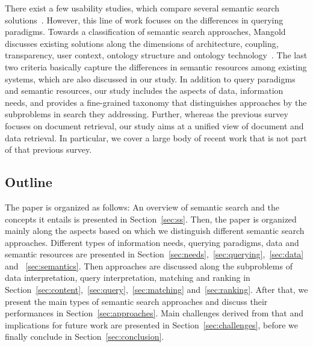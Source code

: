 There exist a few usability studies, which compare several semantic search solutions~\cite{DBLP:conf/semweb/KaufmannB07,DBLP:conf/esws/TranMH10}. However, this line of work focuses on the differences in querying paradigms. Towards a classification of semantic search approaches, Mangold discusses existing solutions along the dimensions of architecture, coupling, transparency, user context, ontology structure and ontology technology~\cite{DBLP:journals/ijmso/Mangold07}. The last two criteria basically capture the differences in semantic resources among existing systems, which are also discussed in our study. In addition to query paradigms and semantic resources, our study includes the aspects of data, information needs, and provides a fine-grained taxonomy that distinguishes approaches by the subproblems in search they addressing. Further, whereas the previous survey~\cite{DBLP:journals/ijmso/Mangold07} focuses on document retrieval, our study aims at a unified view of document and data retrieval. In particular, we cover a large body of recent work that is not part of that previous survey.  


 


\subsection{Outline}
The paper is organized as follows: An overview of semantic search and the concepts it entails is presented in Section~\ref{sec:ss}. Then, the paper is organized mainly along the aspects based on which we distinguish different semantic search approaches. Different types of information needs, querying paradigms, data and semantic resources are presented in Section~\ref{sec:needs},~\ref{sec:querying},~\ref{sec:data} and ~\ref{sec:semantics}. Then approaches are discussed along the subproblems of data interpretation, query interpretation, matching and ranking in Section~\ref{sec:content},~\ref{sec:query},~\ref{sec:matching} and~\ref{sec:ranking}. After that, we present the main types of semantic search approaches and discuss their performances in Section~\ref{sec:approaches}. Main challenges derived from that and implications for future work are presented in Section~\ref{sec:challenges}, before we finally conclude in Section~\ref{sec:conclusion}.